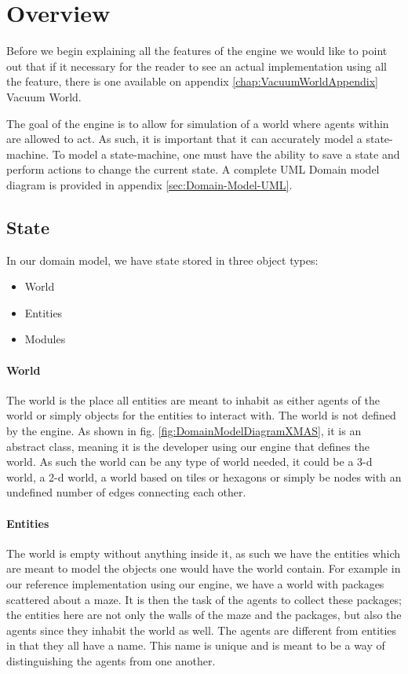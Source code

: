 
\section{Overview}

Before we begin explaining all the features of the engine we would
like to point out that if it necessary for the reader to see an actual
implementation using all the feature, there is one available on appendix
\ref{chap:VacuumWorldAppendix} Vacuum World.

The goal of the engine is to allow for simulation of a world where
agents within are allowed to act. As such, it is important that it
can accurately model a state-machine. To model a state-machine, one
must have the ability to save a state and perform actions to change
the current state. A complete UML Domain model diagram is provided
in appendix \ref{sec:Domain-Model-UML}.


\subsection{State}

In our domain model, we have state stored in three object types:
\begin{itemize}
\item World
\item Entities
\item Modules
\end{itemize}

\paragraph*{World}

The world is the place all entities are meant to inhabit as either
agents of the world or simply objects for the entities to interact
with. The world is not defined by the engine. As shown in fig. \ref{fig:DomainModelDiagramXMAS},
it is an abstract class, meaning it is the developer using our engine
that defines the world. As such the world can be any type of world
needed, it could be a 3-d world, a 2-d world, a world based on tiles
or hexagons or simply be nodes with an undefined number of edges connecting
each other.


\paragraph*{Entities}

The world is empty without anything inside it, as such we have the
entities which are meant to model the objects one would have the world
contain. For example in our reference implementation using our engine,
we have a world with packages scattered about a maze. It is then the
task of the agents to collect these packages; the entities here are
not only the walls of the maze and the packages, but also the agents
since they inhabit the world as well. The agents are different from
entities in that they all have a name. This name is unique and is
meant to be a way of distinguishing the agents from one another. 


